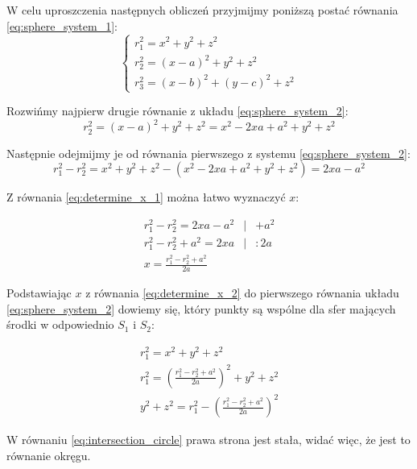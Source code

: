 W celu uproszczenia następnych obliczeń przyjmijmy poniższą postać równania \ref{eq:sphere_system_1}:
\begin{equation}
 \begin{cases}
  r_1^2 = x^2 + y^2 + z^2 \\
  r_2^2 = (x - a)^2 + y^2 + z^2 \\
  r_3^2 = (x - b)^2 + (y - c)^2 + z^2
 \end{cases}
 \label{eq:sphere_system_2}
\end{equation}

Rozwińmy najpierw drugie równanie z układu \ref{eq:sphere_system_2}:
\begin{equation}
 r_2^2 = (x - a)^2 + y^2 + z^2 = x^2 - 2xa + a^2 + y^2 + z^2
\end{equation}

Następnie odejmijmy je od równania pierwszego z systemu \ref{eq:sphere_system_2}:
\begin{equation}
 r_1^2 - r_2^2 = x^2 + y^2 + z^2 - (x^2 - 2xa + a^2 + y^2 + z^2) = 2xa - a^2
 \label{eq:determine_x_1}
\end{equation}

Z równania \ref{eq:determine_x_1} można łatwo wyznaczyć $x$:

\begin{eqnarray}
 r_1^2 - r_2^2 = 2xa - a^2 & | & + a^2\\
 r_1^2 - r_2^2 + a^2 = 2xa & | & \colon 2a\\
 x = \frac{r_1^2 - r_2^2 + a^2}{2a} \label{eq:determine_x_2}
\end{eqnarray}

Podstawiając $x$ z równania \ref{eq:determine_x_2} do pierwszego równania układu \ref{eq:sphere_system_2} dowiemy się, który punkty są wspólne dla sfer mających środki w odpowiednio $S_1$ i $S_2$:

\begin{eqnarray}
 r_1^2 = x^2 + y^2 + z^2 \\
 r_1^2 = \left(\frac{r_1^2 - r_2^2 + a^2}{2a}\right)^2 + y^2 + z^2 \\
 y^2 + z^2 = r_1^2 - \left(\frac{r_1^2 - r_2^2 + a^2}{2a}\right)^2 \label{eq:intersection_circle}
\end{eqnarray}

W równaniu \ref{eq:intersection_circle} prawa strona jest stała, widać więc, że jest to równanie okręgu.

